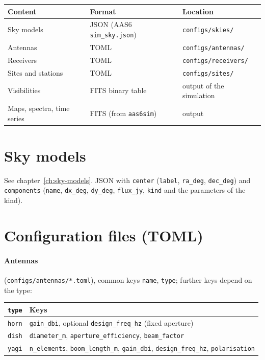\label{ch:data-formats}

\begin{center}
\begin{tabular}{@{}lll@{}}
\toprule
Content & Format & Location \\
\midrule
Sky models & JSON (AAS6 \texttt{sim\_sky.json}) & \texttt{configs/skies/} \\
Antennas & TOML & \texttt{configs/antennas/} \\
Receivers & TOML & \texttt{configs/receivers/} \\
Sites and stations & TOML & \texttt{configs/sites/} \\
Visibilities & FITS binary table & output of the simulation \\
Maps, spectra, time series & FITS (from \texttt{aas6sim}) & output \\
\bottomrule
\end{tabular}
\end{center}

\section{Sky models}

See chapter~\ref{ch:sky-models}. JSON with \texttt{center}
(\texttt{label}, \texttt{ra\_deg}, \texttt{dec\_deg}) and
\texttt{components} (\texttt{name}, \texttt{dx\_deg}, \texttt{dy\_deg},
\texttt{flux\_jy}, \texttt{kind} and the parameters of the kind).

\section{Configuration files (TOML)}

\paragraph*{Antennas} (\texttt{configs/antennas/*.toml}), common keys
\texttt{name}, \texttt{type}; further keys depend on the type:
\begin{center}
\begin{tabular}{@{}ll@{}}
\toprule
\texttt{type} & Keys \\
\midrule
\texttt{horn} & \texttt{gain\_dbi}, optional \texttt{design\_freq\_hz} (fixed aperture) \\
\texttt{dish} & \texttt{diameter\_m}, \texttt{aperture\_efficiency}, \texttt{beam\_factor} \\
\texttt{yagi} & \texttt{n\_elements}, \texttt{boom\_length\_m}, \texttt{gain\_dbi},
                \texttt{design\_freq\_hz}, \texttt{polarisation} \\
\bottomrule
\end{tabular}
\end{center}

